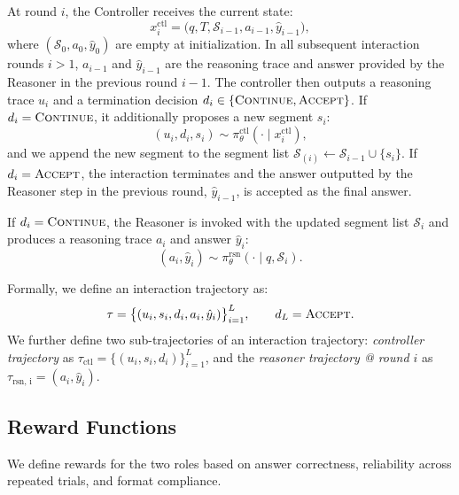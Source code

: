 At round $i$, the Controller receives the current state:
\begin{equation}
x_{i}^{\text{ctl}}=\bigl(q,T,\mathcal{S}_{i-1},a_{i-1},\hat{y}_{i-1}\bigr),
\label{eq:ctl_state}
\end{equation}
where $(\mathcal{S}_{0}, a_{0},\hat{y}_{0})$ are empty at initialization. In all subsequent interaction rounds $i > 1$, $a_{i-1}$ and $\hat{y}_{i-1}$ are the reasoning trace and answer provided by the Reasoner in the previous round $i-1$.
The controller then outputs a reasoning trace $u_i$ and a termination decision
$d_i\in\{\textsc{Continue},\textsc{Accept}\}$.
If $d_i=\textsc{Continue}$, it additionally proposes a new segment $s_i$:
\begin{equation}
(u_i,d_i,s_i)\sim \pi^{\text{ctl}}_\theta(\cdot\mid x_{i}^{\text{ctl}}),
\label{eq:ctl_out}
\end{equation}
and we append the new segment to the segment list $\mathcal{S}_{(i)} \leftarrow \mathcal{S}_{i-1} \cup \{s_i\}$.
If $d_i=\textsc{Accept}$, the interaction terminates and the answer outputted by the Reasoner step in the previous round, $\hat{y}_{i-1}$, is accepted as the final answer.

If $d_i=\textsc{Continue}$, the Reasoner is invoked with the updated segment list $\mathcal{S}_{i}$ and produces a reasoning trace $a_i$ and answer $\hat{y}_i$:
\begin{equation}
(a_i,\hat{y}_i)\sim \pi^{\text{rsn}}_\theta(\cdot\mid q,\mathcal{S}_{i}).
\label{eq:rsn_continue}
\end{equation}

Formally, we define an interaction trajectory as:
\begin{equation}
\tau = \bigl\{(u_i, s_i, d_i, a_i, \hat{y}_i)\bigr\}_{i=1}^{L},
\qquad d_L=\textsc{Accept}.
\end{equation}
We further define two sub-trajectories of an interaction trajectory: \emph{controller trajectory} as $\tau_{\text{ctl}} = \{(u_i, s_i, d_i)\}_{i=1}^{L}$, and the \emph{reasoner trajectory @ round $i$} as $\tau_{\text{rsn, i}} = (a_i, \hat{y}_i)$.


\subsection{Reward Functions}
\label{sec:rewardfunctions}

We define rewards for the two roles based on answer correctness, reliability across repeated trials, and format compliance.

